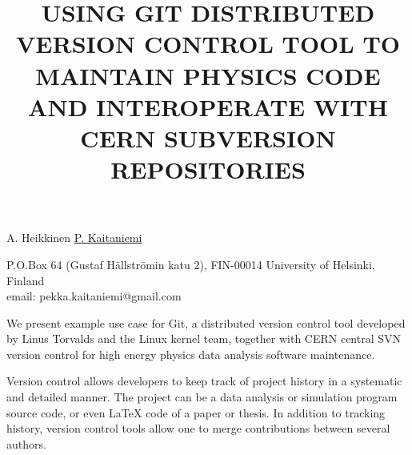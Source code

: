 \documentclass[12pt]{article}
\begin{document}
\title{USING GIT DISTRIBUTED VERSION CONTROL TOOL TO MAINTAIN PHYSICS
  CODE AND INTEROPERATE WITH CERN SUBVERSION REPOSITORIES}

A. Heikkinen \underline{P. Kaitaniemi}

P.O.Box 64 (Gustaf H\"allstr\"omin katu 2), FIN-00014 University of Helsinki, Finland\\
email: pekka.kaitaniemi@gmail.com

\vspace{\baselineskip}


We present example use case for Git, a distributed version control
tool developed by Linus Torvalds and the Linux kernel team, together
with CERN central SVN version control for high energy physics data
analysis software maintenance.

Version control allows developers to keep track of project history in
a systematic and detailed manner. The project can be a data analysis
or simulation program source code, or even LaTeX code of a paper or
thesis. In addition to tracking history, version control tools allow
one to merge contributions between several authors.



\end{document}
